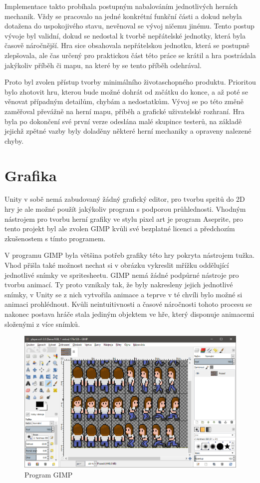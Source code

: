 \documentclass[FM,Proj,bw]{tulthesis}
\begin{document}
	Implementace takto probíhala postupným nabalováním jednotlivých herních mechanik. Vždy se pracovalo na jedné konkrétní funkční části a dokud nebyla dotažena do uspokojivého stavu, nevěnoval se vývoj ničemu jinému. Tento postup vývoje byl validní, dokud se nedostal k tvorbě nepřátelské jednotky, která byla časově náročnější. Hra sice obsahovala nepřátelskou jednotku, která se postupně zlepšovala, ale čas určený pro praktickou část této práce se krátil a hra postrádala jakýkoliv příběh či mapu, na které by se tento příběh odehrával.
	
	Proto byl zvolen přístup tvorby minimálního životaschopného produktu. Prioritou bylo zhotovit hru, kterou bude možné dohrát od začátku do konce, a až poté se věnovat případným detailům, chybám a nedostatkům. Vývoj se po této změně zaměřoval převážně na herní mapu, příběh a grafické uživatelské rozhraní. Hra byla po dokončení své první verze odeslána malé skupince testerů, na základě jejichž zpětné vazby byly doladěny některé herní mechaniky a opraveny nalezené chyby.
	
	\section{Grafika} %
	
	Unity v sobě nemá zabudovaný žádný grafický editor, pro tvorbu spritů do 2D hry je ale možné použít jakýkoliv program s podporou průhlednosti. Vhodným nástrojem pro tvorbu herní grafiky ve stylu pixel art je program Aseprite, pro tento projekt byl ale zvolen GIMP kvůli své bezplatné licenci a předchozím zkušenostem s tímto programem.
	
	V programu GIMP byla většina potřeb grafiky této hry pokryta nástrojem tužka. Vhod přišla také možnost nechat si v obrázku vykreslit mřížku oddělující jednotlivé snímky ve spritesheetu. GIMP nemá žádné podpůrné nástroje pro tvorbu animací. Ty proto vznikaly tak, že byly nakresleny jejich jednotlivé snímky, v Unity se z nich vytvořila animace a teprve v té chvíli bylo možné si animaci prohlédnout. Kvůli neintuitivnosti a časové náročnosti tohoto procesu se nakonec postava hráče stala jediným objektem ve hře, který disponuje animacemi složenými z více snímků.
	
	\begin{figure}[ht]
		\centering
		\includegraphics[width=\textwidth]{img/GIMP}
		\caption{Program GIMP}		
	\end{figure}
	
\end{document}
